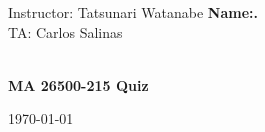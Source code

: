 \documentclass[12pt,letterpaper,addpoints]{exam}%
\begin{document}




\noindent Instructor: Tatsunari Watanabe
\hfill \textbf{Name:\underline{\phantom{My name way too long}}.}\\
\noindent TA: Carlos Salinas
\\\\
\begin{center}
  {\Large \textbf{MA 26500-215 \quad Quiz \examnum}}

  \bigskip

  \today
\end{center}

\end{document}
